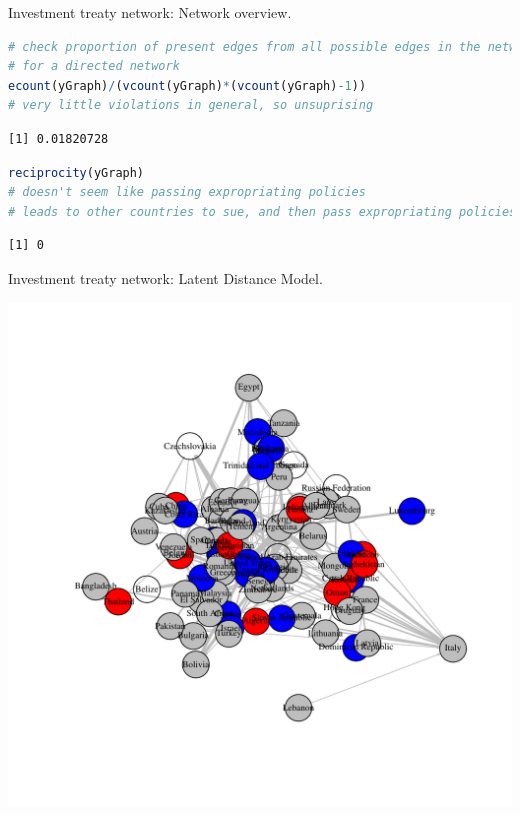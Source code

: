 \documentclass{beamer}
\begin{document}
\begin{frame}[fragile]{\large Investment treaty network: Network overview.}

\begin{lstlisting}[language=R]
# check proportion of present edges from all possible edges in the network.
# for a directed network
ecount(yGraph)/(vcount(yGraph)*(vcount(yGraph)-1))
# very little violations in general, so unsuprising
\end{lstlisting}
\begin{verbatim}
[1] 0.01820728
\end{verbatim}

\begin{lstlisting}[language=R]
reciprocity(yGraph)
# doesn't seem like passing expropriating policies
# leads to other countries to sue, and then pass expropriating policies
\end{lstlisting}
\begin{verbatim}
[1] 0
\end{verbatim}
\end{frame}

\begin{frame}{\large Investment treaty network: Latent Distance Model.}

\includegraphics[width=.99\linewidth]{../figure3.pdf}
\end{frame}
\end{document}
